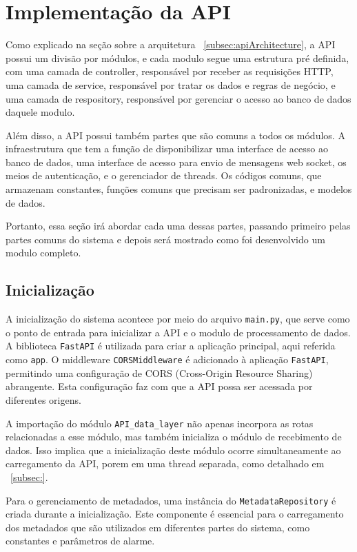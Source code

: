 \section[Implementação da API]{Implementação da API}
Como explicado na seção sobre a arquitetura ~\ref{subsec:apiArchitecture}, a API possui um divisão por módulos, e cada modulo segue uma estrutura pré definida, com uma camada de controller, responsável por receber as requisições HTTP, uma camada de service, responsável por tratar os dados e regras de negócio, e uma camada de respository, responsável por gerenciar o acesso ao banco de dados daquele modulo. 

Além disso, a API possui também partes que são comuns a todos os módulos. A infraestrutura que tem a função de disponibilizar uma interface de acesso ao banco de dados, uma interface de acesso para envio de mensagens web socket, os meios de autenticação, e o gerenciador de threads. Os códigos comuns, que armazenam constantes, funções comuns que precisam ser padronizadas, e modelos de dados.

Portanto, essa seção irá abordar cada uma dessas partes, passando primeiro pelas partes comuns do sistema e depois será mostrado como foi desenvolvido um modulo completo.

\subsection{Inicialização}\label{subsec:main}
A inicialização do sistema acontece por meio do arquivo \texttt{main.py}, que serve como o ponto de entrada para inicializar a API e o modulo de processamento de dados.
A biblioteca \texttt{FastAPI} é utilizada para criar a aplicação principal, aqui referida como \texttt{app}. O middleware \texttt{CORSMiddleware} é adicionado à aplicação \texttt{FastAPI}, permitindo uma configuração de CORS (Cross-Origin Resource Sharing) abrangente. Esta configuração faz com que a API possa ser acessada por diferentes origens.

A importação do módulo \texttt{API\_data\_layer} não apenas incorpora as rotas relacionadas a esse módulo, mas também inicializa o módulo de recebimento de dados. Isso implica que a inicialização deste módulo ocorre simultaneamente ao carregamento da API, porem em uma thread separada, como detalhado em ~\ref{subsec:}.%

Para o gerenciamento de metadados, uma instância do \texttt{MetadataRepository} é criada durante a inicialização. Este componente é essencial para o carregamento dos metadados que são utilizados em diferentes partes do sistema, como constantes e parâmetros de alarme.

